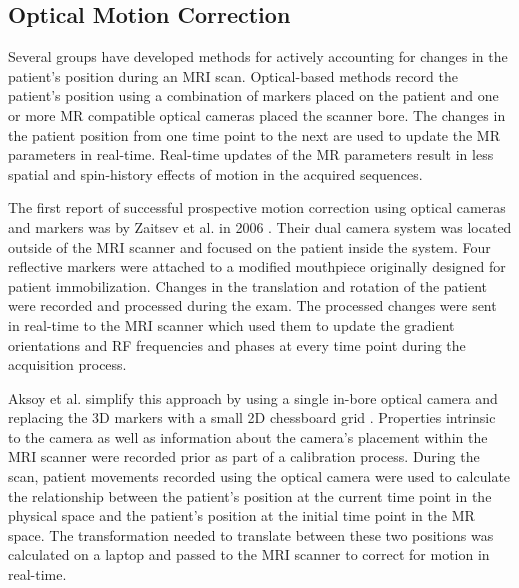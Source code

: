 \subsection{Optical Motion Correction}

Several groups have developed methods for actively accounting for changes in the patient's position during an MRI scan. Optical-based methods record the patient's position using a combination of markers placed on the patient and one or more MR compatible optical cameras placed the scanner bore. The changes in the patient position from one time point to the next are used to update the MR parameters in real-time. Real-time updates of the MR parameters result in less spatial and spin-history effects of motion in the acquired sequences.

The first report of successful prospective motion correction using optical cameras and markers was by Zaitsev et al. in 2006 \cite{Zaitsev2006}. Their dual camera system was located outside of the MRI scanner and focused on the patient inside the system. Four reflective markers were attached to a modified mouthpiece originally designed for patient immobilization. Changes in the translation and rotation of the patient were recorded and processed during the exam. The processed changes were sent in real-time to the MRI scanner which used them to update the gradient orientations and RF frequencies and phases at every time point during the acquisition process.

Aksoy et al. simplify this approach by using a single in-bore optical camera and replacing the 3D markers with a small 2D chessboard grid \cite{Aksoy2008}. Properties intrinsic to the camera as well as information about the camera's placement within the MRI scanner were recorded prior as part of a calibration process. During the scan, patient movements recorded using the optical camera were used to calculate the relationship between the patient's position at the current time point in the physical space and the patient's position at the initial time point in the MR space. The transformation needed to translate between these two positions was calculated on a laptop and passed to the MRI scanner to correct for motion in real-time.

